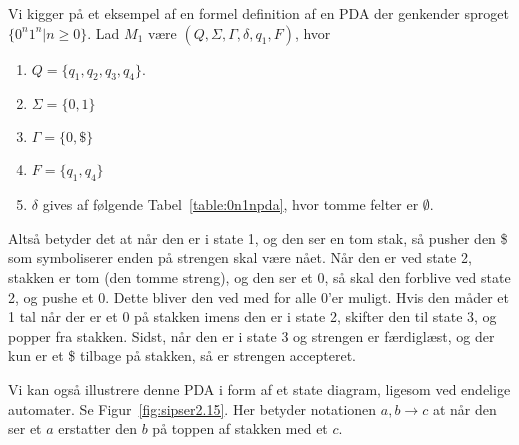 \begin{example}[$\{0^{n}1^{n} | n \ge 0\}$]
	Vi kigger på et eksempel af en formel definition af en PDA der genkender sproget $\{0^{n}1^{n} | n \geq 0\}$.
	Lad $M_{1}$ være $(Q, \Sigma, \Gamma, \delta, q_{1}, F)$, hvor
	\begin{enumerate}
		\item $Q = \{q_{1}, q_{2}, q_{3}, q_{4}\}$.
		\item $\Sigma = \{0,1\}$
		\item $\Gamma = \{0, \$\}$
		\item $F = \{q_{1}, q_{4}\}$
		\item $\delta$ gives af følgende Tabel~\ref{table:0n1npda}, hvor tomme felter er $\emptyset$.
	\end{enumerate}
	Altså betyder det at når den er i state 1, og den ser en tom stak, så pusher den \$ som symboliserer enden på strengen skal være nået. Når den er ved state 2, stakken er tom (den tomme streng), og den ser et 0, så skal den forblive ved state 2, og pushe et 0. Dette bliver den ved med for alle 0'er muligt. Hvis den måder et 1 tal når der er et 0 på stakken imens den er i state 2, skifter den til state 3, og popper fra stakken. Sidst, når den er i state 3 og strengen er færdiglæst, og der kun er et \$ tilbage på stakken, så er strengen accepteret.




	Vi kan også illustrere denne PDA i form af et state diagram, ligesom ved endelige automater. Se Figur~\ref{fig:sipser2.15}. Her betyder notationen $a, b \rightarrow c$ at når den ser et $a$ erstatter den $b$ på toppen af stakken med et $c$.

\end{example}

